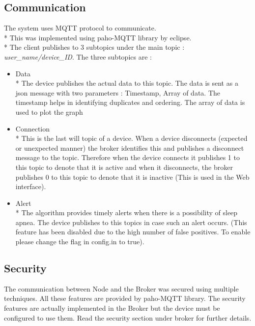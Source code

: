 \documentclass{report}
\begin{document}
\subsection{Communication}

The system uses MQTT protocol to communicate.\\*
This was implemented using paho-MQTT library by eclipse.\\*
The client publishes to 3 subtopics under the main topic : \textit{user\_name/device\_ID}. The three subtopics are : 

\begin{itemize}
    \item Data \\*
    The device publishes the actual data to this topic. The data is sent as a json message with two parameters : Timestamp, Array of data. The timestamp helps in identifying duplicates and ordering. The array of data is used to plot the graph
    \item Connection \\*
    This is the last will topic of a device. When a device disconnects (expected or unexpected manner) the broker identifies this and publishes a disconnect message to the topic. Therefore when the device connects it publishes 1 to this topic to denote that it is active and when it disconnects, the broker publishes 0 to this topic to denote that it is inactive (This is used in the Web interface).
    \item Alert \\*
    The algorithm provides timely alerts when there is a possibility of sleep apnea. The device publishes to this topics in case such an alert occurs. (This feature has been disabled due to the high number of false positives. To enable please change the flag in config.in to true).

\end{itemize}

\subsection{Security}

The communication between Node and the Broker was secured using multiple techniques. All these features are provided by paho-MQTT library. The security features are actually implemented in the Broker but the device must be configured to use them. Read the security section under broker for further details.
\end{document}
